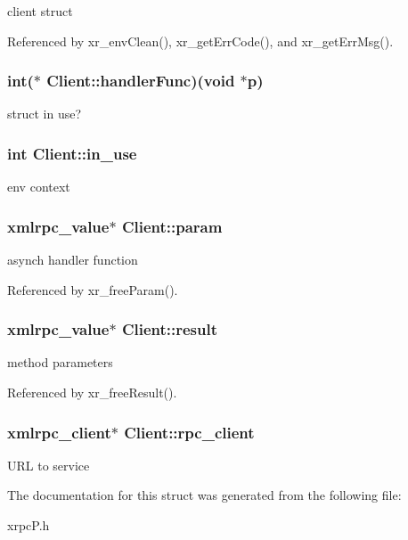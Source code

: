 client struct 

Referenced by xr\_\-envClean(), xr\_\-getErrCode(), and xr\_\-getErrMsg().\hypertarget{structClient_883a4aa7cd951660a7835ca5242bdfc7}{
\subsubsection[{handlerFunc}]{\setlength{\rightskip}{0pt plus 5cm}int($\ast$ {\bf Client::handlerFunc})(void $\ast$p)}}
\label{structClient_883a4aa7cd951660a7835ca5242bdfc7}


struct in use? \hypertarget{structClient_5869e4fdb3a1a88b14faa4f2dda27c66}{
\subsubsection[{in\_\-use}]{\setlength{\rightskip}{0pt plus 5cm}int {\bf Client::in\_\-use}}}
\label{structClient_5869e4fdb3a1a88b14faa4f2dda27c66}


env context \hypertarget{structClient_e4d1bc206122b68b2def984a105ed189}{
\subsubsection[{param}]{\setlength{\rightskip}{0pt plus 5cm}xmlrpc\_\-value$\ast$ {\bf Client::param}}}
\label{structClient_e4d1bc206122b68b2def984a105ed189}


asynch handler function 

Referenced by xr\_\-freeParam().\hypertarget{structClient_5985ff24d5b811f1c96b8a083d6e0e31}{
\subsubsection[{result}]{\setlength{\rightskip}{0pt plus 5cm}xmlrpc\_\-value$\ast$ {\bf Client::result}}}
\label{structClient_5985ff24d5b811f1c96b8a083d6e0e31}


method parameters 

Referenced by xr\_\-freeResult().\hypertarget{structClient_d4a6025c88f880e4bf4060f2018c5695}{
\subsubsection[{rpc\_\-client}]{\setlength{\rightskip}{0pt plus 5cm}xmlrpc\_\-client$\ast$ {\bf Client::rpc\_\-client}}}
\label{structClient_d4a6025c88f880e4bf4060f2018c5695}


URL to service 

The documentation for this struct was generated from the following file:\begin{CompactItemize}
\item 
xrpcP.h\end{CompactItemize}
